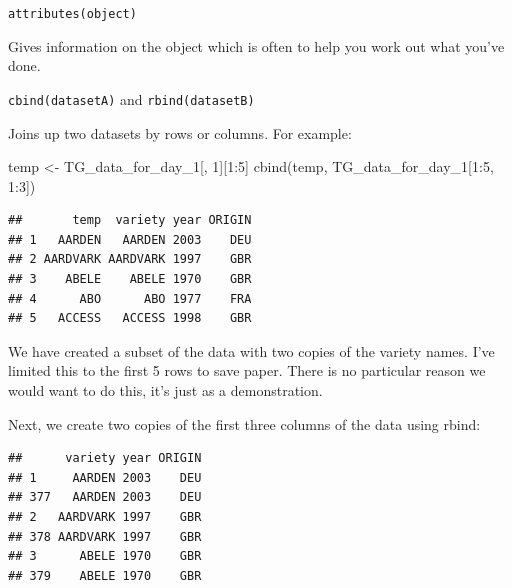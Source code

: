 \documentclass[
]{book}
\newenvironment{Shaded}{\begin{snugshade}}{\end{snugshade}}
\newcommand{\DecValTok}[1]{\textcolor[rgb]{0.00,0.00,0.81}{#1}}
\newcommand{\FunctionTok}[1]{\textcolor[rgb]{0.00,0.00,0.00}{#1}}
\newcommand{\NormalTok}[1]{#1}
\newcommand{\OtherTok}[1]{\textcolor[rgb]{0.56,0.35,0.01}{#1}}
\newcommand{\SpecialCharTok}[1]{\textcolor[rgb]{0.00,0.00,0.00}{#1}}
\begin{document}
\texttt{attributes(object)}

Gives information on the object which is often to help you work out what you've done.

\texttt{cbind(datasetA)} and \texttt{rbind(datasetB)}

Joins up two datasets by rows or columns. For example:

\begin{Shaded}
\begin{Highlighting}[]
\NormalTok{temp }\OtherTok{\textless{}{-}}\NormalTok{ TG\_data\_for\_day\_1[, }\DecValTok{1}\NormalTok{][}\DecValTok{1}\SpecialCharTok{:}\DecValTok{5}\NormalTok{]}
\FunctionTok{cbind}\NormalTok{(temp, TG\_data\_for\_day\_1[}\DecValTok{1}\SpecialCharTok{:}\DecValTok{5}\NormalTok{, }\DecValTok{1}\SpecialCharTok{:}\DecValTok{3}\NormalTok{])}
\end{Highlighting}
\end{Shaded}

\begin{verbatim}
##       temp  variety year ORIGIN
## 1   AARDEN   AARDEN 2003    DEU
## 2 AARDVARK AARDVARK 1997    GBR
## 3    ABELE    ABELE 1970    GBR
## 4      ABO      ABO 1977    FRA
## 5   ACCESS   ACCESS 1998    GBR
\end{verbatim}

We have created a subset of the data with two copies of the variety names. I've limited this to the first 5 rows to save paper. There is no particular reason we would want to do this, it's just as a demonstration.

Next, we create two copies of the first three columns of the data using rbind:

\begin{Shaded}
\end{Shaded}

\begin{verbatim}
##      variety year ORIGIN
## 1     AARDEN 2003    DEU
## 377   AARDEN 2003    DEU
## 2   AARDVARK 1997    GBR
## 378 AARDVARK 1997    GBR
## 3      ABELE 1970    GBR
## 379    ABELE 1970    GBR
\end{verbatim}
\end{document}
